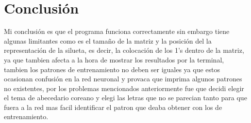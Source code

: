 \documentclass[10pt]{article}         %
\begin{document}
\section{Conclusión}
Mi conclusión es que el programa funciona correctamente sin embargo tiene algunas limitantes como es el tamaño de la matriz y la posición del la representación de la silueta, es decir, la colocación de los 1's dentro de la matriz, ya que tambien afecta a la hora de mostrar los resultados por la terminal, tambien los patrones de entrenamiento no deben ser iguales ya que estos ocasionan confusión en la red neuronal y provaca que imprima algunos patrones no existentes, por los problemas mencionados anteriormente fue que decidi elegir el tema de abecedario coreano y elegi las letras que no se parecian tanto para que fuera a la red mas facil identificar el patron que deaba obtener con los de entrenamiento.

	
\end{document}
